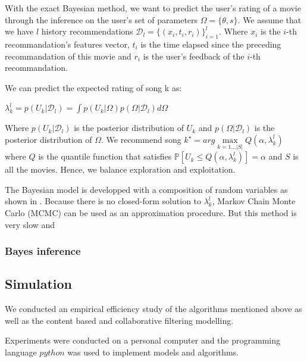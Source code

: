 \documentclass[letterpaper]{article}
\begin{document}
With the exact Bayesian method, we want to predict the user's rating of a movie through the inference on the user's set of parameters $\Omega = \lbrace \theta , s \rbrace $. We assume that we have $l$ history recommendations $ \mathcal{D}_l = \lbrace (x_i, t_i, r_i) \rbrace^l_{i=1}$. Where $x_i$ is the $i$-th recommandation's features vector, $t_i$ is the time elapsed since the preceding recommandation of this movie and $r_i$ is the user's feedback of the $i$-th recommandation.

We can predict the expected rating of song k as:
\begin{center}
$\lambda^l_k = p(U_k | \mathcal{D}_l) = \int p(U_k|\Omega)p(\Omega| \mathcal{D}_l)d\Omega$
\end{center}
Where $p(U_k|\mathcal{D}_l)$ is the posterior distribution of $U_k$ and $ p(\Omega| \mathcal{D}_l) $ is the posterior distribution of $ \Omega $. We recommend song $k^{\star} = arg \max\limits_{k=1...|S|} Q(\alpha, \lambda^l_k)$ where $Q$ is the quantile function that satisfies $ \mathbb{P} [ U_k \le Q(\alpha, \lambda^l_k) ]=\alpha$ and $S$ is all the movies. 
Hence, we balance exploration and exploitation.

The Bayesian model is developped with a composition of random variables as shown in \cite{main}. Because there is no closed-form solution to $ \lambda^l_k$, Markov Chain Monte Carlo (MCMC) can be used as an approximation procedure. But this method is very slow and


\subsubsection{Bayes inference}


\subsection{Simulation}

We conducted an empirical efficiency study of the algorithms mentioned above as well as the content based and collaborative filtering modelling.

Experiments were conducted on a personal computer and the programming language $python$ was used to implement models and algorithms.
\end{document}
